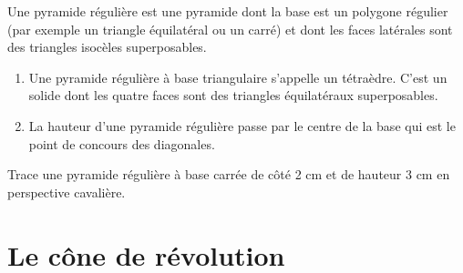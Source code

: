 \documentclass[a4paper,10pt]{report}
\begin{document}
\begin{defn}
Une pyramide régulière est une pyramide dont la base est un polygone régulier (par exemple un triangle équilatéral ou un carré) et dont les faces latérales sont des triangles isocèles superposables.
\end{defn}

\noindent \begin{minipage}{11cm}
\begin{rem}\medskip
\begin{enumerate}
\item[•] Une pyramide régulière à base triangulaire s'appelle un tétraèdre.
C'est un solide dont les quatre faces sont des triangles équilatéraux superposables.\medskip
\item[•] La hauteur d'une pyramide régulière passe par le centre de la base qui est le point de concours des diagonales.
\end{enumerate} 
\end{rem}
\end{minipage}
\begin{minipage}{5cm}
\vspace{10mm}
\begin{center}
\end{center}
\end{minipage}

\begin{ex}
Trace une pyramide régulière à base carrée de côté 2 cm et de hauteur 3 cm en perspective cavalière.

\noindent\grandscarreaux{\linewidth}{6.4cm}
\end{ex}

\section{Le cône de révolution}
\end{document}
